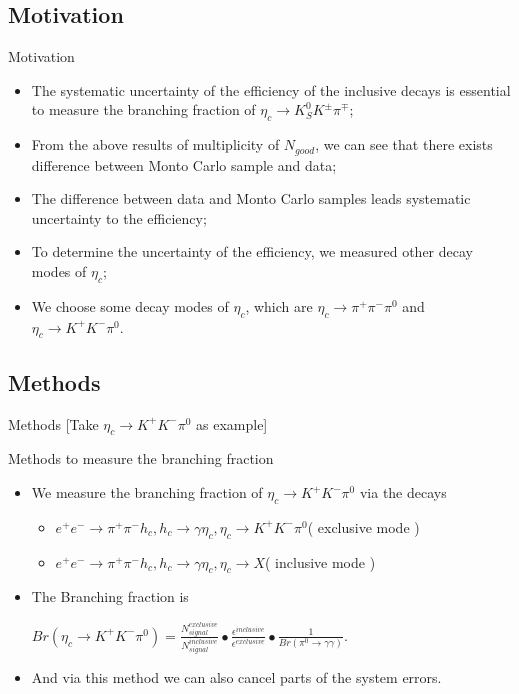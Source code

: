 \documentclass{beamer}
\begin{document}
\subsection{Motivation}
\begin{frame}{Motivation}
  \begin{itemize}
    \item The systematic uncertainty of the efficiency of the inclusive decays is essential to measure the branching fraction of $\eta_c\to K_S^0 K^{\pm}\pi^{\mp}$;
    \item From the above results of multiplicity of $N_{good}$, we can see that there exists difference between Monto Carlo sample and data;
    \item The difference between data and Monto Carlo samples leads systematic uncertainty to the efficiency;
    \item To determine the uncertainty of the efficiency, we measured other decay modes of $\eta_c$;
    \item We choose some decay modes of $\eta_c$, which are $\eta_c\to\pi^+\pi^-\pi^0$ and $\eta_c\to K^+K^-\pi^0$.
  \end{itemize}
\end{frame}
\subsection{Methods}
\begin{frame}{Methods [Take $\eta_c\to K^+K^-\pi^0$ as example]}
  \begin{block}{Methods to measure the branching fraction}
    \begin{itemize}
      \item We measure the branching fraction of $\eta_c\to K^+K^-\pi^0$ via the decays
        \begin{itemize}
          \item $e^+e^-\to \pi^+ \pi^- h_c, h_c\to \gamma\eta_c, \eta_c\to K^+K^-\pi^0$( exclusive mode )
          \item $e^+e^-\to \pi^+ \pi^- h_c, h_c\to \gamma\eta_c, \eta_c\to X$( inclusive mode )
        \end{itemize}
      \item The Branching fraction is\\
        \begin{center}
          $Br(\eta_c\to K^+K^-\pi^0) = \frac{N^{exclusive}_{signal}}{N^{inclusive}_{signal}}\bullet\frac{\epsilon^{inclusive}}{\epsilon^{exclusive}}\bullet\frac{1}{Br(\pi^0\to\gamma\gamma)}$.
        \end{center}
    \end{itemize}
  \end{block}
  \begin{block}{}
    \begin{itemize}
      \item And via this method we can also cancel parts of the system errors.
    \end{itemize}
  \end{block}
\end{frame}
\end{document}
